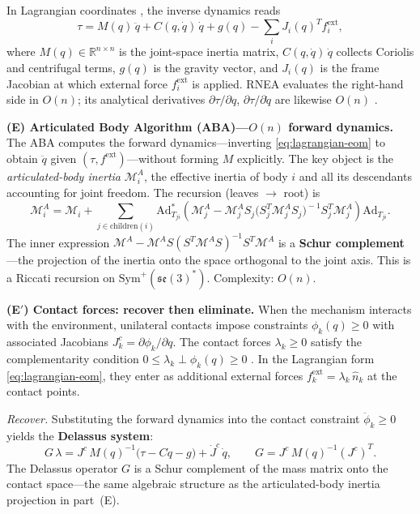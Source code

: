 \documentclass[12pt]{amsart}
\theoremstyle{definition}
\theoremstyle{remark}
\newcommand{\R}{\mathbb{R}}
\newcommand{\cM}{\mathcal{M}}
\begin{document}
\noindent In Lagrangian coordinates \cite{CarpentierMansard}, the inverse dynamics reads
\begin{equation}\label{eq:lagrangian-eom}
\tau = M(q)\,\ddot{q} + C(q,\dot{q})\,\dot{q} + g(q)
  - \sum_i J_i(q)^T f_i^{\mathrm{ext}},
\end{equation}
where $M(q) \in \R^{n \times n}$ is the joint-space inertia matrix,
$C(q,\dot{q})\,\dot{q}$ collects Coriolis and centrifugal terms,
$g(q)$ is the gravity vector, and $J_i(q)$ is the frame Jacobian at
which external force $f_i^{\mathrm{ext}}$ is applied.
RNEA evaluates the right-hand side in $O(n)$; its analytical
derivatives $\partial\tau/\partial q$, $\partial\tau/\partial\dot{q}$
are likewise $O(n)$ \cite{CarpentierMansard}.

\medskip\noindent\textbf{(E) Articulated Body Algorithm (ABA)---$O(n)$
forward dynamics.}
The ABA computes the forward dynamics---inverting \eqref{eq:lagrangian-eom}
to obtain $\ddot{q}$ given $(\tau, f^{\mathrm{ext}})$---without forming
$M$ explicitly.
The key object is the \emph{articulated-body inertia} $\cM_i^A$, the
effective inertia of body $i$ and all its descendants accounting for joint
freedom.
The recursion (leaves $\to$ root) is
\[
\cM_i^A = \cM_i + \!\!\sum_{j \in \mathrm{children}(i)}
  \mathrm{Ad}_{T_{ji}}^*
  \!\left(\cM_j^A
    - \cM_j^A S_j \bigl(S_j^T \cM_j^A S_j\bigr)^{\!-1} S_j^T \cM_j^A
  \right) \mathrm{Ad}_{T_{ji}}.
\]
The inner expression
$\cM^A - \cM^A S(S^T\cM^A S)^{-1} S^T \cM^A$ is a \textbf{Schur
complement}---the projection of the inertia onto the space orthogonal to the
joint axis.
This is a Riccati recursion on $\mathrm{Sym}^+(\mathfrak{se}(3)^*)$.
Complexity: $O(n)$.

\medskip\noindent\textbf{(E$'$) Contact forces: recover then eliminate.}
When the mechanism interacts with the environment, unilateral contacts
impose constraints $\phi_k(q) \geq 0$ with associated Jacobians
$J_k^c = \partial\phi_k/\partial q$.
The contact forces $\lambda_k \geq 0$ satisfy the complementarity
condition $0 \leq \lambda_k \perp \phi_k(q) \geq 0$ \cite{MenagerCarpentier2025}.
In the Lagrangian form \eqref{eq:lagrangian-eom}, they enter as
additional external forces $f_k^{\mathrm{ext}} = \lambda_k\,\hat{n}_k$
at the contact points.

\medskip\noindent\emph{Recover.}
Substituting the forward dynamics into the contact constraint
$\ddot{\phi}_k \geq 0$ yields the \textbf{Delassus system}:
\[
G\,\lambda = J^c\, M(q)^{-1}\bigl(\tau - C\dot{q} - g\bigr)
  + \dot{J}^c\,\dot{q},
\qquad G = J^c\, M(q)^{-1} (J^c)^T.
\]
The Delassus operator $G$ is a Schur complement of the mass matrix
onto the contact space---the same algebraic structure as the
articulated-body inertia projection in part~(E).
\end{document}
